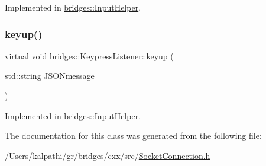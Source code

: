 Implemented in \mbox{\hyperlink{classbridges_1_1_input_helper_a250df70ebe8470f1cb492c17a69c79d7}{bridges\+::\+Input\+Helper}}.

\mbox{\label{classbridges_1_1_keypress_listener_ad5af91d35dc485182056ca821f3ce03e}} 
\subsubsection{\texorpdfstring{keyup()}{keyup()}}
{\footnotesize\ttfamily virtual void bridges\+::\+Keypress\+Listener\+::keyup (\begin{DoxyParamCaption}\item[{std\+::string}]{J\+S\+O\+Nmessage }\end{DoxyParamCaption})\hspace{0.3cm}{\ttfamily [pure virtual]}}



Implemented in \mbox{\hyperlink{classbridges_1_1_input_helper_a55757d526340d939052cf1dca755262b}{bridges\+::\+Input\+Helper}}.



The documentation for this class was generated from the following file\+:\begin{DoxyCompactItemize}
\item 
/\+Users/kalpathi/gr/bridges/cxx/src/\mbox{\hyperlink{_socket_connection_8h}{Socket\+Connection.\+h}}\end{DoxyCompactItemize}
